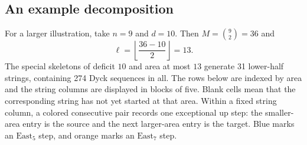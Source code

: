 \documentclass[11pt]{article}
\theoremstyle{plain}
\theoremstyle{definition}
\theoremstyle{remark}
\begin{document}
\subsection{An example decomposition}
\label{subsec:string-example}
For a larger illustration, take \(n=9\) and \(d=10\).  Then
\(M=\binom92=36\) and
\[
  \ell=\left\lfloor\frac{36-10}{2}\right\rfloor=13 .
\]
The special skeletons of deficit \(10\) and area at most \(13\)
generate 31 lower-half strings, containing 274 Dyck sequences in
all.  The rows below are indexed by area and the string columns are
displayed in blocks of five.  Blank cells mean that the corresponding
string has not yet started at that area.  Within a fixed string column, a
colored consecutive pair records one exceptional \(\mathrm{up}\) step: the
smaller-area entry is the source and the next larger-area entry is the target.
Blue marks an \(\mathrm{East}_5\) step, and orange marks an
\(\mathrm{East}_7\) step.
\par\medskip
\begingroup
\scriptsize
\newcommand{\dseq}[1]{\texttt{[#1]}}
\newcommand{\rseq}[1]{\textcolor{red}{\dseq{#1}}}
\newcommand{\bseq}[1]{\textcolor{blue}{\dseq{#1}}}
\newcommand{\gseq}[1]{\textcolor{orange}{\dseq{#1}}}
\setlength{\tabcolsep}{1.2pt}
\par\medskip
\end{document}
